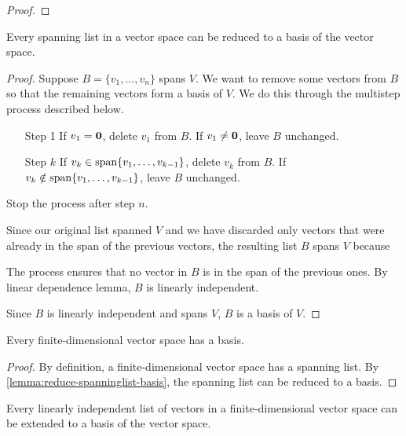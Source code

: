 \begin{proof}

\end{proof}

\begin{lemma}\label{lemma:reduce-spanninglist-basis}
Every spanning list in a vector space can be reduced to a basis of the vector space.
\end{lemma}

\begin{proof}
Suppose $B=\{v_1,\dots,v_n\}$ spans $V$. We want to remove some vectors from $B$ so that the remaining vectors form a basis of $V$. We do this through the multistep process described below.

\begin{enumerate}
\item[Step 1] If $v_1=\vb{0}$, delete $v_1$ from $B$. If $v_1\neq\vb{0}$, leave $B$ unchanged.
\item[Step $k$] If $v_k\in\operatorname{span}\{v_1,\dots,v_{k-1}\}$, delete $v_k$ from $B$. If $v_k\notin\operatorname{span}\{v_1,\dots,v_{k-1}\}$, leave $B$ unchanged.
\end{enumerate}

Stop the process after step $n$.

Since our original list spanned $V$ and we have discarded only vectors that were already in the span of the previous vectors, the resulting list $B$ spans $V$ because

The process ensures that no vector in $B$ is in the span of the previous ones. By linear dependence lemma, $B$ is linearly independent.

Since $B$ is linearly independent and spans $V$, $B$ is a basis of $V$.
\end{proof}

\begin{proposition}
Every finite-dimensional vector space has a basis.
\end{proposition}

\begin{proof}
By definition, a finite-dimensional vector space has a spanning list. By \cref{lemma:reduce-spanninglist-basis}, the spanning list can be reduced to a basis.
\end{proof}

\begin{lemma}\label{lemma:extend-linind-basis}
Every linearly independent list of vectors in a finite-dimensional vector space can be extended to a basis of the vector space.
\end{lemma}

